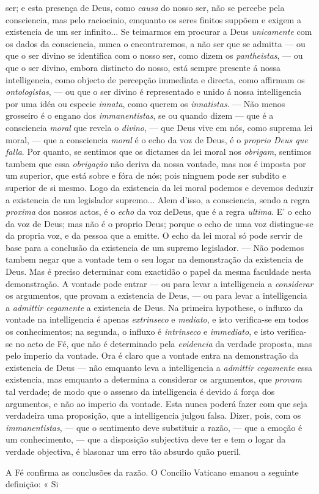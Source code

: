 ser; e esta presença de Deus, como \emph{causa} do nosso ser, não se percebe pela consciencia, mas pelo raciocinio, emquanto os seres finitos suppõem e exigem a existencia de um ser infinito... Se teimarmos em procurar a Deus \emph{unicamente} com os dados da consciencia, nunca o encontraremos, a não ser que se admitta --- ou que o ser divino se identifica com o nosso ser, como dizem os \emph{pantheistas}, --- ou que o ser divino, embora distincto do nosso, está sempre presente á nossa intelligencia, como objecto de percepção immediata e directa, como affirmam os \emph{ontologistas}, --- ou que o ser divino é representado e unido á nossa intelligencia por uma idéa ou especie \emph{innata}, como querem os \emph{innatistas}. --- Não menos grosseiro é o engano dos \emph{immanentistas}, se ou quando dizem --- que é a consciencia \emph{moral} que revela o \emph{divino}, --- que Deus vive em nós, como suprema lei moral, --- que a consciencia \emph{moral} é o echo da voz de Deus, é o \emph{proprio Deus que falla}. Por quanto, se sentimos que os dictames da lei moral nos \emph{obrigam}, sentimos tambem que essa \emph{obrigação} não deriva da nossa vontade, mas nos é imposta por um superior, que está sobre e fóra de nós; pois ninguem pode ser subdito e superior de si mesmo. Logo da existencia da lei moral podemos e devemos deduzir a existencia de um legislador supremo... Alem d'isso, a consciencia, sendo a regra \emph{proxima} dos nossos actos, é o \emph{echo} da voz deDeus, que é a regra \emph{ultima}. E' o echo da voz de Deus; mas não é o proprio Deus; porque o echo de uma voz distingue-se da propria voz, e da pessoa que a emitte. O echo da lei moral só pode servir de base para a conclusão da existencia de um supremo legislador. --- Não podemos tambem negar que a vontade tem o seu logar na demonstração da existencia de Deus. Mas é preciso determinar com exactidão o papel da mesma faculdade nesta demonstração. A vontade pode entrar --- ou para levar a intelligencia a \emph{considerar} os argumentos, que provam a existencia de Deus, --- ou para levar a intelligencia a \emph{admittir cegamente} a existencia de Deus. Na primeira hypothese, o influxo da vontade na intelligencia é apenas \emph{extrinseco} e \emph{mediato}, e isto verifica-se em todos os conhecimentos; na segunda, o influxo é \emph{intrinseco} e \emph{immediato}, e isto verifica-se no acto de Fé, que não é determinado pela \emph{evidencia} da verdade proposta, mas pelo imperio da vontade. Ora é claro que a vontade entra na demonstração da existencia de Deus --- não emquanto leva a intelligencia a \emph{admittir cegamente} essa existencia, mas emquanto a determina a considerar os argumentos, que \emph{provam} tal verdade; de modo que o assenso da intelligencia é devido á força dos argumentos, e não ao imperio da vontade. Esta nunca poderá fazer com que seja verdadeira uma proposição, que a intelligencia julgou falsa. Dizer, pois, com os \emph{immanentistas}, --- que o sentimento deve substituir a razão, --- que a emoção é um conhecimento, --- que a disposição subjectiva deve ter e tem o logar da verdade objectiva, é blasonar um erro tão absurdo quão pueril.\par A Fé confirma as conclusões da razão. O Concilio Vaticano emanou a seguinte definição: « Si 